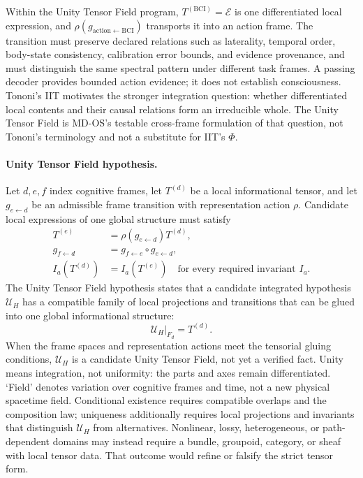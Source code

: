 \documentclass[10pt,twocolumn]{article}
\theoremstyle{definition}
\theoremstyle{plain}
\theoremstyle{remark}
\begin{document}
Within the Unity Tensor Field program, $T^{(\mathrm{BCI})}=\mathcal E$ is one differentiated local expression, and $\rho(g_{\mathrm{action}\leftarrow\mathrm{BCI}})$ transports it into an action frame.  The transition must preserve declared relations such as laterality, temporal order, body-state consistency, calibration error bounds, and evidence provenance, and must distinguish the same spectral pattern under different task frames.  A passing decoder provides bounded action evidence; it does not establish consciousness.  Tononi's IIT motivates the stronger integration question: whether differentiated local contents and their causal relations form an irreducible whole.  The Unity Tensor Field is MD-OS's testable cross-frame formulation of that question, not Tononi's terminology and not a substitute for IIT's $\Phi$.


\paragraph{Unity Tensor Field hypothesis.}
Let $d,e,f$ index cognitive frames, let $T^{(d)}$ be a local informational tensor, and let $g_{e\leftarrow d}$ be an admissible frame transition with representation action $\rho$.  Candidate local expressions of one global structure must satisfy
\begin{align}
T^{(e)} &= \rho(g_{e\leftarrow d})T^{(d)},\label{eq:unity-local}\\
g_{f\leftarrow d} &= g_{f\leftarrow e}\circ g_{e\leftarrow d},\label{eq:unity-cocycle}\\
I_a(T^{(d)}) &= I_a(T^{(e)})\quad\text{for every required invariant }I_a.\label{eq:unity-invariants}
\end{align}
The Unity Tensor Field hypothesis states that a candidate integrated hypothesis $\mathcal U_H$ has a compatible family of local projections and transitions that can be glued into one global informational structure:
\begin{equation}
\left.\mathcal U_H\right|_{F_d}=T^{(d)}.
\label{eq:unity-field}
\end{equation}
When the frame spaces and representation actions meet the tensorial gluing conditions, $\mathcal U_H$ is a candidate Unity Tensor Field, not yet a verified fact.  Unity means integration, not uniformity: the parts and axes remain differentiated.  `Field' denotes variation over cognitive frames and time, not a new physical spacetime field.  Conditional existence requires compatible overlaps and the composition law; uniqueness additionally requires local projections and invariants that distinguish $\mathcal U_H$ from alternatives.  Nonlinear, lossy, heterogeneous, or path-dependent domains may instead require a bundle, groupoid, category, or sheaf with local tensor data.  That outcome would refine or falsify the strict tensor form.
\end{document}
